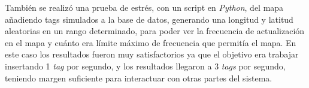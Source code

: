 También se realizó una prueba de estrés, con un script en \textit{Python}, del mapa añadiendo tags simulados a la base de datos, generando una longitud y latitud aleatorias en un rango determinado, para poder ver la frecuencia de actualización en el mapa y cuánto era límite máximo de frecuencia que permitía el mapa. En este caso los resultados fueron muy satisfactorios ya que el objetivo era trabajar insertando 1 \textit{tag} por segundo, y los resultados llegaron a 3 \textit{tags} por segundo, teniendo margen suficiente para interactuar con otras partes del sistema.